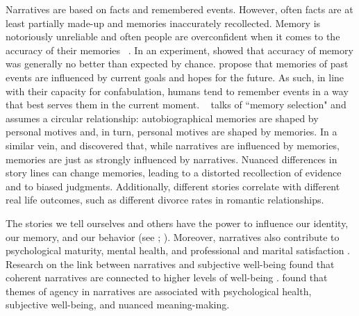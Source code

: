 \documentclass[11pt,a4paper,english,oneside]{book}
\numberwithin{equation}{chapter}
\begin{document}
Narratives are based on facts and remembered events. However, often facts are at least partially made-up and memories inaccurately recollected. Memory is notoriously unreliable and often people are overconfident when it comes to the accuracy of their memories ~\citep{McAdams.2006}. In an experiment, \citet{Offer.2000} showed that accuracy of memory was generally no better than expected by chance. \citet{Conway.2000} propose that memories of past events are influenced by current goals and hopes for the future. As such, in line with their capacity for confabulation, humans tend to remember events in a way that best serves them in the current moment. ~\citet[~p. 300]{McAdams.1982} talks of ``memory selection" and assumes a circular relationship: autobiographical memories are shaped by personal motives and, in turn, personal motives are shaped by memories. In a similar vein, \citet{McGregor.1999} and \citet{Murray.1994} discovered that, while narratives are influenced by memories, memories are just as strongly influenced by narratives. Nuanced differences in story lines can change memories, leading to a distorted recollection of evidence and to biased judgments. Additionally, different stories correlate with different real life outcomes, such as different divorce rates in romantic relationships. 

The stories we tell ourselves and others have the power to influence our identity, our memory, and our behavior (see \citealp{Pasupathi.1998}; \citealp{Murray.1994}). Moreover, narratives also contribute to psychological maturity, mental health, and professional and marital satisfaction \citep[p. 248]{McAdams.}. Research on the link between narratives and subjective well-being found that coherent narratives are connected to higher levels of well-being \citep{King.2000}. \cite{Adler.2008} found that themes of agency in narratives are associated with psychological health, subjective well-being, and nuanced meaning-making. 
\end{document}
